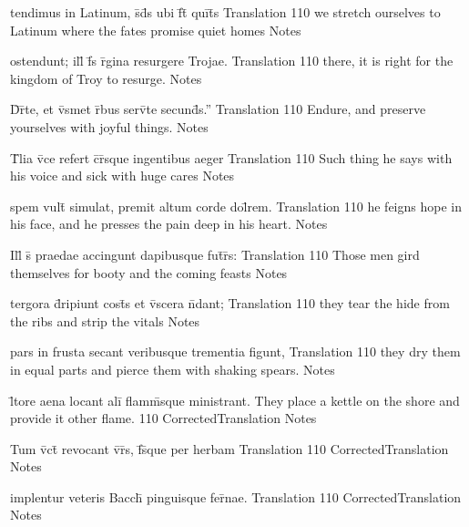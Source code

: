 \documentclass[]{book}
\begin{document}
\latline
  {tendimus in Latinum, s\={}d\={}s ubi f\={}t\={} qui\={}t\={}s}
  { Translation }
  {110}
  { we stretch ourselves to Latinum where the fates promise quiet homes }
  { Notes }


\latline
  {ostendunt; ill\={\macron {\i}} f\={}s r\={}gina resurgere Trojae.}
  { Translation }
  {110}
  { there, it is right for the kingdom of Troy to resurge. }
  { Notes }


\latline
  {D\={}r\={}te, et v\={}smet r\={}bus serv\={}te secund\={\macron {\i}}s.''}
  { Translation }
  {110}
  { Endure, and preserve yourselves with joyful things. }
  { Notes }


\latline
  {T\={}lia v\={}ce refert c\={}r\={\macron {\i}}sque ingentibus aeger}
  { Translation }
  {110}
  { Such thing he says with his voice and sick with huge cares  }
  { Notes }


\latline
  {spem vult\={} simulat, premit altum corde dol\={}rem.}
  { Translation }
  {110}
  { he feigns hope in his face, and he presses the pain deep in his heart. }
  { Notes }


\latline
  {Ill\={\macron {\i}} s\={} praedae accingunt dapibusque fut\={}r\={\macron {\i}}s:}
  { Translation }
  {110}
  { Those men gird themselves for booty and the coming feasts }
  { Notes }


\latline
  {tergora d\={\macron {\i}}ripiunt cost\={\macron {\i}}s et v\={\macron {\i}}scera n\={}dant;}
  { Translation }
  {110}
  { they tear the hide from the ribs and strip the vitals }
  { Notes }


\latline
  {pars in frusta secant veribusque trementia figunt,}
  { Translation }
  {110}
  { they dry them in equal parts and pierce them with shaking spears. }
  { Notes }


\latline
  {l\={\macron {\i}}tore aena locant ali\={\macron {\i}} flamm\={}sque ministrant.}
  { They place a kettle on the shore and provide it other flame. }
  {110}
  { CorrectedTranslation }
  { Notes }


\latline
  {Tum v\={\macron {\i}}ct\={} revocant v\={\macron {\i}}r\={\macron {\i}}s, f\={}s\={\macron {\i}}que per herbam}
  { Translation }
  {110}
  { CorrectedTranslation }
  { Notes }


\latline
  {implentur veteris Bacch\={\macron {\i}} pinguisque fer\={\macron {\i}}nae.}
  { Translation }
  {110}
  { CorrectedTranslation }
  { Notes }
\end{document}
